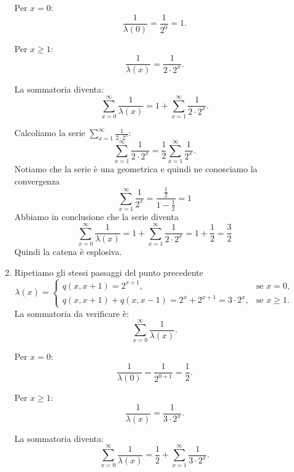 \documentclass[a4paper,12pt]{article}
\begin{document}
\begin{itemize}
\begin{enumerate}[label=\alph*)]
			Per \(x = 0\):
			\[
			\frac{1}{\lambda(0)} = \frac{1}{2^0} = 1.
			\]
			
			Per \(x \geq 1\):
			\[
			\frac{1}{\lambda(x)} = \frac{1}{2 \cdot 2^x}.
			\]
			
			La sommatoria diventa:
			\[
			\sum_{x=0}^\infty \frac{1}{\lambda(x)} = 1 + \sum_{x=1}^\infty \frac{1}{2 \cdot 2^x}.
			\]
			
			Calcoliamo la serie \(\sum_{x=1}^\infty \frac{1}{2 \cdot 2^x}\):
			\[
			\sum_{x=1}^\infty \frac{1}{2 \cdot 2^x} = \frac{1}{2} \sum_{x=1}^\infty \frac{1}{2^x}.
			\]
			Notiamo che la serie è una geometrica e quindi ne conosciamo la convergenza\\
			\[
			\sum_{x=1}^\infty \frac{1}{2^x} = \frac{\frac{1}{2}}{1-\frac{1}{2}}=1
			\]
			Abbiamo in conclusione che la serie diventa\\
			\[
			\sum_{x=0}^\infty \frac{1}{\lambda(x)} = 1 + \sum_{x=1}^\infty \frac{1}{2 \cdot 2^x}=1+\frac{1}{2}=\frac{3}{2}
			\]
			Quindi la catena è esplosiva.
			\item Ripetiamo gli stessi passaggi del punto precedente\\
			\[
			\lambda(x) =
			\begin{cases} 
				q(x, x+1) = 2^{x+1}, & \text{se } x = 0, \\ 
				q(x, x+1) + q(x, x-1) = 2^x + 2^{x+1} = 3 \cdot 2^x, & \text{se } x \geq 1.
			\end{cases}
			\]
			La sommatoria da verificare è:
			\[
			\sum_{x=0}^\infty \frac{1}{\lambda(x)}.
			\]
			
			Per \(x = 0\):
			\[
			\frac{1}{\lambda(0)} = \frac{1}{2^{0+1}} = \frac{1}{2}.
			\]
			
			Per \(x \geq 1\):
			\[
			\frac{1}{\lambda(x)} = \frac{1}{3 \cdot 2^x}.
			\]
			
			La sommatoria diventa:
			\[
			\sum_{x=0}^\infty \frac{1}{\lambda(x)} = \frac{1}{2} + \sum_{x=1}^\infty \frac{1}{3 \cdot 2^x}.
			\]
			

\end{enumerate}
\end{itemize}
\end{document}
